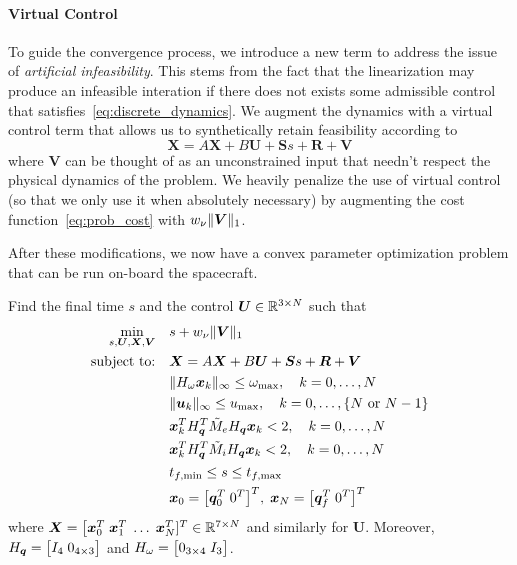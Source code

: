 \documentclass[12pt]{article}
\begin{document}
\paragraph{Virtual Control}

To guide the convergence process, we introduce a new term to address the issue of \textit{artificial infeasibility}. This stems from the fact that the linearization may produce an infeasible interation if there does not exists some admissible control that satisfies~\eqref{eq:discrete_dynamics}. We augment the dynamics with a virtual control term that allows us to synthetically retain feasibility according to
\begin{equation}
\bm{X} = A \bm{X} + B \bm{U} + \bm{S} s + \bm{R} + \bm{V}
\label{eq:VC_discrete_dynamics}
\end{equation}
where $\bm{V}$ can be thought of as an unconstrained input that needn't respect the physical dynamics of the problem. We heavily penalize the use of virtual control (so that we only use it when absolutely necessary) by augmenting the cost function~\eqref{eq:prob_cost} with $w_{\nu} \| \bm{V} \|_1$.

After these modifications, we now have a convex parameter optimization problem that can be run on-board the spacecraft. 

\begin{problem}\label{prob:prob2}
Find the final time $s$ and the control $\bm{U}\in{\mathbb{R}}^{3 \times N}$ such that
\begin{subequations}\label{eq:prob2}
\begin{align}
\min_{s,\bm{U},\bm{X},\bm{V}} &\quad s + w_{\nu} \| \bm{V} \|_1 \label{eq:p2_a}\\
\text{subject to:} &\quad \bm{X} = A \bm{X} + B \bm{U} + \bm{S} s + \bm{R} + \bm{V} \label{eq:p2_b}\\
&\quad \| H_{\omega} \bm{x}_k \|_{\infty} \leq \omega_{\max}, \quad k=0,\ldots,N \label{eq:p2_c}\\ 
&\quad \| \bm{u}_k \|_{\infty} \leq u_{\max}, \quad k=0,\ldots,\{N \text{ or } N-1\} \label{eq:p2_d}\\
&\quad \bm{x}_k^T H_{\bm{q}}^T \tilde{M}_e H_{\bm{q}} \bm{x}_k < 2, \quad k=0,\ldots,N \label{eq:p2_e}\\
&\quad \bm{x}_k^T H_{\bm{q}}^T \tilde{M}_i H_{\bm{q}} \bm{x}_k < 2, \quad k=0,\ldots,N \label{eq:p2_f}\\
&\quad t_{f,\min} \leq s \leq t_{f,\max} \label{eq:p2_g}\\
&\quad \bm{x}_0 = \big[ \bm{q}_0^T \; 0^T \big]^T, \; \bm{x}_N = \big[ \bm{q}_f^T \; 0^T \big]^T \label{eq:p2_h}
\end{align}
\end{subequations}
where $\bm{X} = \big[ \bm{x}_0^T \; \bm{x}_1^T \; \ldots \; \bm{x}_{N}^T ]^T \in {\mathbb{R}}^{7 \times N}$ and similarly for $\bm{U}$. Moreover, $H_{\bm{q}} = \big[ I_{4} \; 0_{4 \times 3} \big]$ and $H_{\omega} = \big[ 0_{3 \times 4} \; I_{3} \big]$.
\end{problem}
\end{document}
